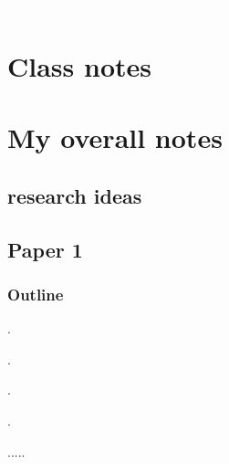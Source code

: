 \documentclass[12pt]{article}
\begin{document}



	

	



	

	{\textcolor{white}.}

	

\section*{Class notes}



\pagebreak







\section*{My overall notes}



	\subsection*{research ideas}

\pagebreak







	\subsection*{Paper 1}



		\begin{abstract}

	 ...

		\end{abstract}



			\subsubsection*{Outline}

			\begin{outline}[enumerate]

			\1 .

				\2 .

					\3 .

						\4 .

		\0 .....

			\end{outline}
\end{document}
